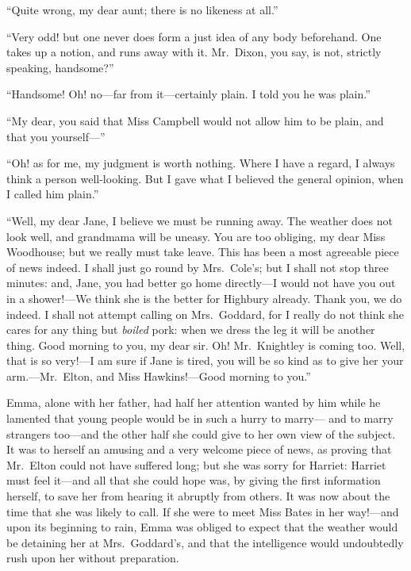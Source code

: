 ``Quite wrong, my dear aunt; there is no likeness at all.''

``Very odd! but one never does form a just idea of any body beforehand.
One takes up a notion, and runs away with it.  Mr.\ Dixon, you say,
is not, strictly speaking, handsome?''

``Handsome!  Oh! no---far from it---certainly plain.  I told you he
was plain.''

``My dear, you said that Miss Campbell would not allow him to be plain,
and that you yourself---''

``Oh! as for me, my judgment is worth nothing.  Where I have a regard,
I always think a person well-looking. But I gave what I believed
the general opinion, when I called him plain.''

``Well, my dear Jane, I believe we must be running away.
The weather does not look well, and grandmama will be uneasy.
You are too obliging, my dear Miss Woodhouse; but we really must
take leave.  This has been a most agreeable piece of news indeed.
I shall just go round by Mrs.\ Cole's; but I shall not stop three minutes:
and, Jane, you had better go home directly---I would not have you
out in a shower!---We think she is the better for Highbury already.
Thank you, we do indeed.  I shall not attempt calling on Mrs.\ Goddard,
for I really do not think she cares for any thing but \emph{boiled} pork:
when we dress the leg it will be another thing.  Good morning to you,
my dear sir.  Oh!  Mr.\ Knightley is coming too.  Well, that is
so very!---I am sure if Jane is tired, you will be so kind as to
give her your arm.---Mr.\ Elton, and Miss Hawkins!---Good morning
to you.''

Emma, alone with her father, had half her attention wanted by him
while he lamented that young people would be in such a hurry to marry---%
and to marry strangers too---and the other half she could give
to her own view of the subject.  It was to herself an amusing
and a very welcome piece of news, as proving that Mr.\ Elton
could not have suffered long; but she was sorry for Harriet:
Harriet must feel it---and all that she could hope was, by giving
the first information herself, to save her from hearing it abruptly
from others.  It was now about the time that she was likely to call.
If she were to meet Miss Bates in her way!---and upon its beginning
to rain, Emma was obliged to expect that the weather would be
detaining her at Mrs.\ Goddard's, and that the intelligence would
undoubtedly rush upon her without preparation.

